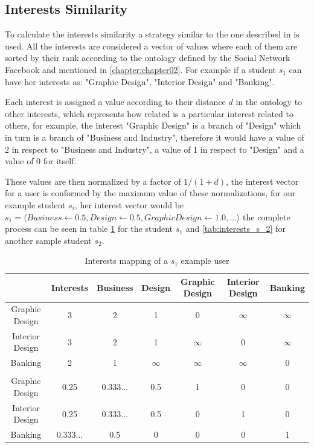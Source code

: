 \subsection{Interests Similarity}

To calculate the interests similarity a strategy similar to the one described in \cite{taxonomy_semantic_similarity} is used. All the interests are considered a vector of values where each of them are sorted by their rank according to the ontology defined by the Social Network Facebook and mentioned in \ref{chapter:chapter02}. For example if a student $s_1$ can have her interests as: "Graphic Design", "Interior Design" and "Banking". 

Each interest is assigned a value according to their distance $d$ in the ontology to other interests, which represents how related is a particular interest related to others, for example, the interest "Graphic Design" is a branch of "Design" which in turn is a branch of "Business and Industry", therefore it would have a value of 2 in respect to "Business and Industry", a value of 1 in respect to "Design" and a value of 0 for itself.

These values are then normalized by a factor of $1/(1+d)$, the interest vector for a user is conformed by the maximum value of these normalizations, for our example student $s_i$, her interest vector would be $s_1 = \langle Business \gets 0.5, Design \gets 0.5, Graphic Design \gets 1.0,...\rangle$ the complete process can be seen in table \ref{tab:interests_s_1} for the student $s_1$ and \ref{tab:interests_s_2} for another sample student $s_2$.

\begin{table}[]
\caption{Interests mapping of a $s_1$ example user}
\label{tab:interests_s_1}
\centering
\begin{tabular}{|c|c|c|c|c|c|c|}
\hline
                & Interests & Business & Design   & Graphic Design & Interior Design & Banking  \\ \hline
Graphic Design  & 3         & 2                     & 1        & 0              & $\infty$        & $\infty$ \\ \hline
Interior Design & 3         & 2                     & 1        & $\infty$       & 0               & $\infty$ \\ \hline
Banking         & 2         & 1                     & $\infty$ & $\infty$       & $\infty$        & 0        \\ \hline
                &           &                       &          &                &                 &          \\ \hline 
Graphic Design  & 0.25      & 0.333...              & 0.5      & 1              & 0               & 0        \\ \hline
Interior Design & 0.25      & 0.333...              & 0.5      & 0              & 1               & 0        \\ \hline
Banking         & 0.333...  & 0.5                   & 0        & 0              & 0               & 1        \\ \hline
\end{tabular}
\end{table}


